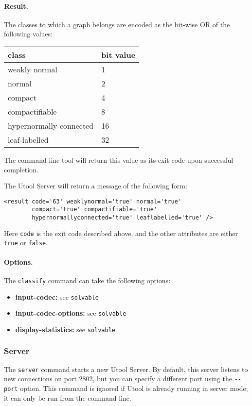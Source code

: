 \paragraph{Result.}
The classes to which a graph belongs are encoded as the bit-wise OR of
the following values:

\begin{center}
\begin{tabular}{l|l}
class & bit value \\ \hline
weakly normal & 1 \\
normal & 2 \\
compact & 4 \\
compactifiable & 8 \\
hypernormally connected & 16 \\
leaf-labelled & 32
\end{tabular}
\end{center}

The command-line tool will return this value as its exit code upon
successful completion.

The Utool Server will return a message of the following form:
\begin{verbatim}
<result code='63' weaklynormal='true' normal='true'
        compact='true' compactifiable='true'
        hypernormallyconnected='true' leaflabelled='true' />
\end{verbatim}

Here \verb?code? is the exit code described above, and the other
attributes are either \verb?true? or \verb?false?.


\paragraph{Options.}
The \verb?classify? command can take the following options:
\begin{itemize}
\item \textbf{input-codec:} see \verb?solvable? 
\item \textbf{input-codec-options:} see \verb?solvable? 
\item \textbf{display-statistics:} see \verb?solvable?
\end{itemize}



\subsubsection{Server}

The \verb?server? command starts a new Utool Server. By default, this
server listens to new connections on port 2802, but you can specify a
different port using the \verb?--port? option. This command is ignored
if Utool is already running in server mode; it can only be run from
the command line.

